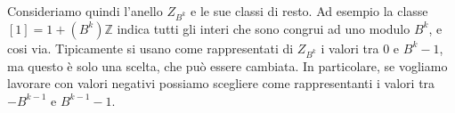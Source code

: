 
Consideriamo quindi l'anello $Z_{B^k}$ e le sue classi di resto. Ad esempio
la classe $[1] = 1 + (B^k)\mathbb{Z}$ indica tutti gli interi che sono congrui ad uno modulo $B^k$, e cosi via. Tipicamente si usano come rappresentati di $Z_{B^k}$
i valori tra $0$ e $B^k-1$, ma questo è solo una scelta, che può essere cambiata. In particolare, se vogliamo lavorare con valori negativi possiamo
scegliere come rappresentanti i valori tra $-B^{k-1}$ e $B^{k-1}-1$.

